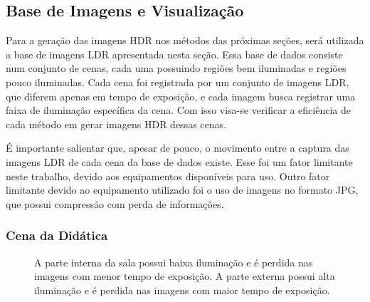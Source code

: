 \subsection{Base de Imagens e Visualização} \label{metodoBaseImg}

Para a geração das imagens HDR nos métodos das próximas seções, será utilizada a base de imagens LDR apresentada nesta seção. Essa base de dados consiste num conjunto de cenas, cada uma possuindo regiões bem iluminadas e regiões pouco iluminadas. Cada cena foi registrada por um conjunto de imagens LDR, que diferem apenas em tempo de exposição, e cada imagem busca registrar uma faixa de iluminação específica da cena. Com isso visa-se verificar a eficiência de cada método em gerar imagens HDR dessas cenas.

É importante salientar que, apesar de pouco, o movimento entre a captura das imagens LDR de cada cena da base de dados existe. Esse foi um fator limitante neste trabalho, devido aos equipamentos disponíveis para uso. Outro fator limitante devido ao equipamento utilizado foi o uso de imagens no formato JPG, que possui compressão com perda de informações.

\subsubsection{Cena da Didática} \label{cenaDidatica}

\begin{figure}[H]
  \quad %
  \quad %
  \quad %
  \quad %
  \caption{A parte interna da sala possui baixa iluminação e é perdida nas imagens com menor tempo de exposição. A parte externa possui alta iluminação e é perdida nas imagens com maior tempo de exposição.}
  \label{figBaseDidaticas}
\end{figure}


